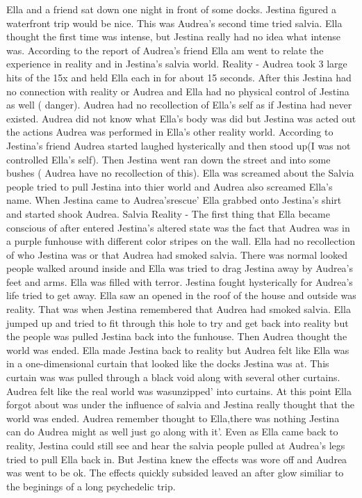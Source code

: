 \documentclass[12pt]{book}
\begin{document}
Ella and a friend sat down one night in front of some docks. Jestina figured a waterfront trip would be nice. This was Audrea's second time tried salvia. Ella thought the first time was intense, but Jestina really had no idea what intense was. According to the report of Audrea's friend Ella am went to relate the experience in reality and in Jestina's salvia world. Reality - Audrea took 3 large hits of the 15x and held Ella each in for about 15 seconds. After this Jestina had no connection with reality or Audrea and Ella had no physical control of Jestina as well ( danger). Audrea had no recollection of Ella's self as if Jestina had never existed. Audrea did not know what Ella's body was did but Jestina was acted out the actions Audrea was performed in Ella's other reality world. According to Jestina's friend Audrea started laughed hysterically and then stood up(I was not controlled Ella's self). Then Jestina went ran down the street and into some bushes ( Audrea have no recollection of this). Ella was screamed about the Salvia people tried to pull Jestina into thier world and Audrea also screamed Ella's name. When Jestina came to Audrea'srescue' Ella grabbed onto Jestina's shirt and started shook Audrea. Salvia Reality - The first thing that Ella became conscious of after entered Jestina's altered state was the fact that Audrea was in a purple funhouse with different color stripes on the wall. Ella had no recollection of who Jestina was or that Audrea had smoked salvia. There was normal looked people walked around inside and Ella was tried to drag Jestina away by Audrea's feet and arms. Ella was filled with terror. Jestina fought hysterically for Audrea's life tried to get away. Ella saw an opened in the roof of the house and outside was reality. That was when Jestina remembered that Audrea had smoked salvia. Ella jumped up and tried to fit through this hole to try and get back into reality but the people was pulled Jestina back into the funhouse. Then Audrea thought the world was ended. Ella made Jestina back to reality but Audrea felt like Ella was in a one-dimensional curtain that looked like the docks Jestina was at. This curtain was was pulled through a black void along with several other curtains. Audrea felt like the real world was wasunzipped' into curtains. At this point Ella forgot about was under the influence of salvia and Jestina really thought that the world was ended. Audrea remember thought to Ella,there was nothing Jestina can do Audrea might as well just go along with it'. Even as Ella came back to reality, Jestina could still see and hear the salvia people pulled at Audrea's legs tried to pull Ella back in. But Jestina knew the effects was wore off and Audrea was went to be ok. The effects quickly subsided leaved an after glow similiar to the beginings of a long psychedelic trip.
\end{document}
